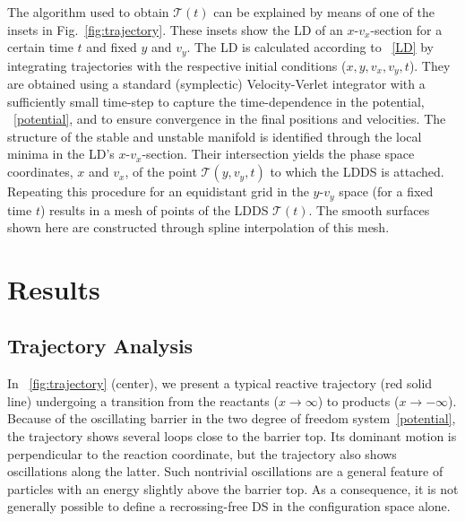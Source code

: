 \documentclass{elsarticle}
\def\EDITS#1{{\color{green}#1}}
\def\EDITS#1{#1}
\def\EDITS#1{{\color{mygreen}#1}}
\begin{document}
The algorithm used to obtain $\mathcal{T}(t)$ can be explained by means
of one of the insets in Fig.~\ref{fig:trajectory}. These insets show the LD 
of an
$x$-$v_x$-section for a certain time $t$ and fixed $y$ and $v_y$.
The LD is calculated according to \EQ~\eqref{LD} by integrating
trajectories with the respective initial conditions ($x, y, v_x, v_y, t$). 
They are obtained using
a standard (symplectic) Velocity-Verlet integrator with a sufficiently small
time-step to capture the time-dependence in the potential,
\EQ~\eqref{potential}, and to ensure convergence in the final 
positions and velocities.
The structure of the stable and unstable manifold is identified
through the local minima in the LD's $x$-$v_x$-section. 
Their intersection yields the phase space coordinates, $x$ and $v_x$,
of the point $\mathcal{T}(y, v_y, t)$ 
\EDITS{to which the LDDS is attached.}
Repeating this procedure for an equidistant grid in the $y$-$v_y$ space
(for a fixed time $t$)
results in a mesh of points of the LDDS $\mathcal{T}(t)$.
The smooth surfaces shown here are constructed through spline interpolation
of this mesh.


\section{Results}
\subsection{Trajectory Analysis}

In \FIG~\ref{fig:trajectory} (center), we present a typical reactive trajectory 
(red solid line) undergoing a transition from the reactants ($x\to\infty$) to 
products ($x\to-\infty$).
Because of the oscillating barrier in the two degree of freedom 
system~\eqref{potential}, the trajectory shows several loops close to the
barrier top.
Its dominant motion is perpendicular to the reaction coordinate, but the 
trajectory also shows oscillations along the latter.
Such nontrivial oscillations are a general feature of particles with an energy 
slightly above the barrier top.
As a consequence, it is not generally
possible to define a recrossing-free DS in the configuration space alone.
\end{document}
